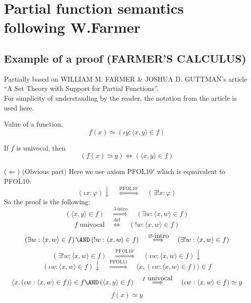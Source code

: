 \def\topic{Farmer's calculus}


\section{Partial function semantics following W.Farmer}

\subsection{Example of a proof (FARMER'S CALCULUS)}
Partially based on WILLIAM M. FARMER \& JOSHUA D. GUTTMAN's article\\
``A Set Theory with Support for Partial Functions''.\\
For simplicity of understanding by the reader, the notation from the article is used here.\\
\begin{definition} Value of a function.
\[
f(x) \simeq \left(\iota y: \langle x,y\rangle\in f\right)
\]
\end{definition}

\begin{theorem} If $f$ is univocal, then
\[
\left(f(x)\simeq y\right)\iff \left(\langle x,y\rangle\in f\right)
\]
\end{theorem}
\Proof
($\Leftarrow$) (Obvious part) Here we use axiom PFOL$10'$ which is equaivalent to PFOL10:
\[
(\iota x:\varphi)\downarrow
\quad\overset{\mbox{PFOL10}'}{\Longleftrightarrow}\quad
(\exists!x:\varphi)
\]
So the proof is the following:
\[
\left(\langle x,y\rangle\in f\right)
\quad\overset{\exists\mbox{-intro}}{\Longrightarrow}\quad
\left(\exists w: \langle x,w\rangle\in f\right)
\]
\[
f\mbox{ univocal}
\quad\overset{\mbox{def}}{\Longleftrightarrow}\quad
\left(! w: \langle x,w\rangle\in f\right)
\]
\[
\left(\exists w: \langle x,w\rangle\in f\right)
\AND
\left(! w: \langle x,w\rangle\in f\right)
\quad\overset{\exists!\mbox{-intro}}{\Longrightarrow}\quad
\left(\exists! w: \langle x,w\rangle\in f\right)
\]
\[
\left(\exists! w: \langle x,w\rangle\in f\right)
\quad\overset{\mbox{PFOL10}'}{\Longrightarrow}\quad
\left(\iota w: \langle x,w\rangle\in f\right)\downarrow
\]
\[
\left(\iota w: \langle x,w\rangle\in f\right)\downarrow 
\quad\overset{\mbox{PFOL11}}{\Longrightarrow}\quad
\langle x,(\iota w: \langle x,w\rangle\in f)\rangle\in f
\]
\[
\langle x,(\iota w: \langle x,w\rangle\in f)\rangle\in f
\AND
\left(\langle x,y\rangle\in f\right)
\quad\overset{f \mbox{ univocal}}{\Longrightarrow}\quad
(\iota w: \langle x,w\rangle\in f) \simeq y
\]
\[
f(x) \simeq y
\]

